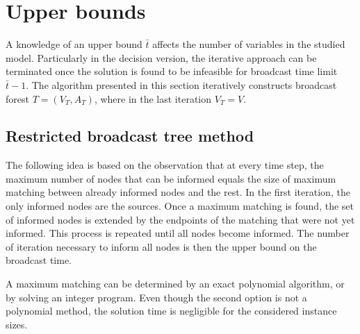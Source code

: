 \section{Upper bounds} \label{sec:ub}

A knowledge of an upper bound $\bar{t}$ affects the number of variables in the studied model. 
Particularly in the decision version, the iterative approach can be terminated once the solution is found to be infeasible for broadcast time limit $\bar{t}-1$.
The algorithm presented in this section iteratively constructs broadcast forest $T=(V_T,A_T)$, where in the last iteration $V_T=V$.

\subsection{Restricted broadcast tree method}

The following idea is based on the observation that at every time step, the maximum number of nodes that can be informed equals the size of maximum matching between already informed nodes and the rest.
In the first iteration, the only informed nodes are the sources.
Once a maximum matching is found, the set of informed nodes is extended by the endpoints of the matching that were not yet informed.
This process is repeated until all nodes become informed.
The number of iteration necessary to inform all nodes is then the upper bound on the broadcast time.

A maximum matching can be determined by an exact polynomial algorithm, or by solving an integer program.
Even though the second option is not a polynomial method, the solution time is negligible for the considered instance sizes.


